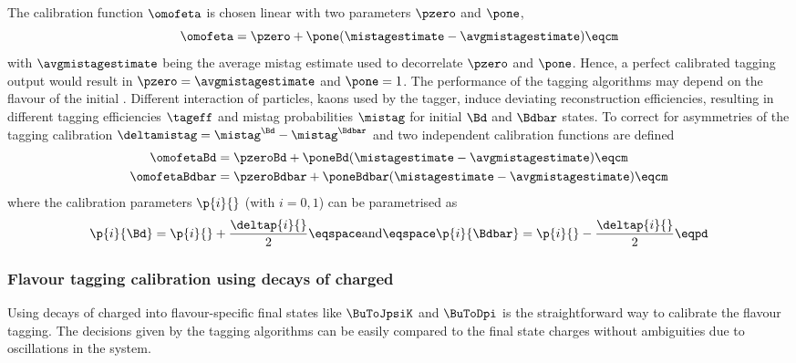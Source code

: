 The calibration function $\omofeta$ is chosen linear with two parameters
$\pzero$ and $\pone$,
%
\begin{equation}\label{eq:flavour_tagging:calibration:method:calibration}
  \omofeta = \pzero + \pone (\mistagestimate - \avgmistagestimate)\eqcm
\end{equation}
%
with $\avgmistagestimate$ being the average mistag estimate used to decorrelate
$\pzero$ and $\pone$. Hence, a perfect calibrated tagging output would result in
$\pzero = \avgmistagestimate$ and $\pone = 1$. The performance of the tagging
algorithms may depend on the flavour of the initial \Bmeson. Different
interaction of particles, \eg kaons used by the \OSK tagger, induce deviating
reconstruction efficiencies, resulting in different tagging efficiencies
$\tageff$ and mistag probabilities $\mistag$ for initial $\Bd$ and $\Bdbar$
states. To correct for asymmetries of the tagging calibration $\deltamistag =
\mistag^{\Bd} - \mistag^{\Bdbar}$ and two independent calibration functions are
defined
%
\begin{equation}\label{eq:flavour_tagging:calibration:method:asymmetric_calibration:omega}
  \begin{split}
    \omofetaBd    &= \pzeroBd    + \poneBd    (\mistagestimate - \avgmistagestimate)\eqcm \\
    \omofetaBdbar &= \pzeroBdbar + \poneBdbar (\mistagestimate - \avgmistagestimate)\eqcm
  \end{split}
\end{equation}
%
where the calibration parameters $\p{i}{}$ (with $i=0,1$) can be parametrised as
%
\begin{equation}\label{eq:flavour_tagging:calibration:method:asymmetric_calibration:ps}
  \p{i}{\Bd} = \p{i}{} + \frac{\deltap{i}{}}{2} \eqspace\text{and}\eqspace \p{i}{\Bdbar} = \p{i}{} - \frac{\deltap{i}{}}{2}\eqpd
\end{equation}

\subsubsection{Flavour tagging calibration using decays of charged \Bmesons}
\label{sec:flavour_tagging:calibration:method:charged}

Using decays of charged \Bmesons into flavour-specific final states like
$\BuToJpsiK$ and $\BuToDpi$ is the straightforward way to calibrate the flavour
tagging. The decisions given by the tagging algorithms can be easily compared to
the final state charges without ambiguities due to oscillations in the \Bmeson
system.

